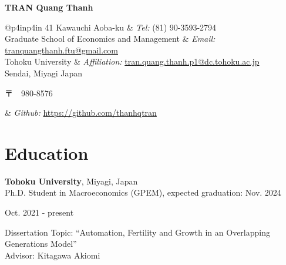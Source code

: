 \documentclass[a4paper,20pt]{article}
\newcommand\textjp[1]{%
	\begin{CJK}{UTF8}{min}#1\end{CJK}}
\begin{document}
	
	
	\begin{center}
		\textbf{{\LARGE \color{black} TRAN Quang Thanh}}
	\end{center}
	
	\hrulefill
	\vspace{2pt}
	
	\begin{tabular}{@{}p{4in}p{4in}}
		41 Kawauchi Aoba-ku                          & {\it Tel:}  (81) 90-3593-2794                                                                              \\            
		Graduate School of Economics and Management  & {\it Email:}  \href{mailto:tranquangthanh.ftu@gmail.com}{tranquangthanh.ftu@gmail.com}                     \\         
		Tohoku University                            & {\it Affiliation:}  \href{mailto:tran.quang.thanh.p1@dc.tohoku.ac.jp}{tran.quang.thanh.p1@dc.tohoku.ac.jp} \\       
		Sendai, Miyagi Japan \textjp{〒　980-8576} & {\it Github:} \href{https://github.com/thanhqtran}{https://github.com/thanhqtran}                          \\     
	\end{tabular}
	
	\vspace{4pt}
	
	
	\section{Education}
	\begin{minipage}{.7\linewidth} \begin{flushleft}
			\textbf{Tohoku University}, Miyagi, Japan \\
			\hspace{4mm} Ph.D. Student in Macroeconomics (GPEM), expected graduation: Nov. 2024
	\end{flushleft} \end{minipage}
	\hfill 
	\begin{minipage}{.25\linewidth}\begin{flushright}
			Oct. 2021 - present \\
			
	\end{flushright}\end{minipage}
	
	\vspace{2pt}
	\hspace{4mm} Dissertation Topic:  ``Automation, Fertility and Growth in an Overlapping Generations Model'' \\
	\hspace{4mm} Advisor:  Kitagawa Akiomi
	\vspace{2pt}
	
\end{document}
